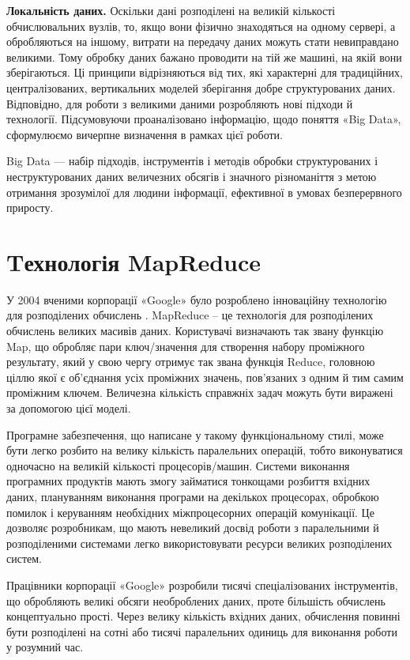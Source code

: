 \textbf{Локальність даних.} Оскільки дані розподілені на великій кількості обчислювальних вузлів,
то, якщо вони фізично знаходяться на одному сервері,
а обробляються на іншому, витрати на передачу даних можуть стати невиправдано великими.
Тому обробку даних бажано проводити на тій же машині, на якій вони зберігаються.
Ці принципи відрізняються від тих, які характерні для традиційних, централізованих, вертикальних моделей зберігання добре структурованих даних. Відповідно, для роботи з великими даними розробляють нові підходи й технології.
Підсумовуючи проаналізовано інформацію,
щодо поняття «Big Data», сформулюємо вичерпне визначення в рамках цієї роботи.

Big Data — набір підходів, інструментів і методів обробки структурованих і неструктурованих даних величезних обсягів і значного різноманіття з метою отримання зрозумілої для людини інформації, ефективної в умовах безперервного приросту.

\section{Tехнологія MapReduce}

У 2004 вченими корпорації «Google» було розроблено інноваційну технологію для розподілених обчислень \cite{GoogleMapReduce}.
MapReduce – це технологія для розподілених обчислень великих масивів даних.
Користувачі визначають так звану функцію Map, що обробляє
пари ключ/значення для створення набору проміжного результату, який у свою чергу отримує
так звана функція Reduce, головною ціллю якої є об'єднання усіх проміжних значень, пов'язаних з одним й тим самим проміжним ключем.
Величезна кількість справжніх задач можуть бути виражені за допомогою цієї моделі.

Програмне забезпечення, що написане у такому функціональному стилі,
може бути легко розбито на велику кількість паралельних операцій, тобто виконуватися одночасно на
великій кількості процесорів/машин.
Системи виконання програмних продуктів мають змогу займатися
тонкощами розбиття вхідних даних, плануванням виконання програми на декількох процесорах,
обробкою помилок і керуванням необхідних міжпроцесорних операцій комунікації.
Це дозволяє розробникам, що мають невеликий досвід роботи з паралельними
й розподіленими системами легко використовувати ресурси великих розподілених систем.

Працівники корпорації «Google» розробили тисячі спеціалізованих
інструментів, що обробляють великі обсяги необроблених даних,
проте більшість обчислень концептуально прості.
Через велику кількість вхідних даних, обчислення повинні бути розподілені на
сотні або тисячі паралельних одиниць для виконання роботи у розумний час.

